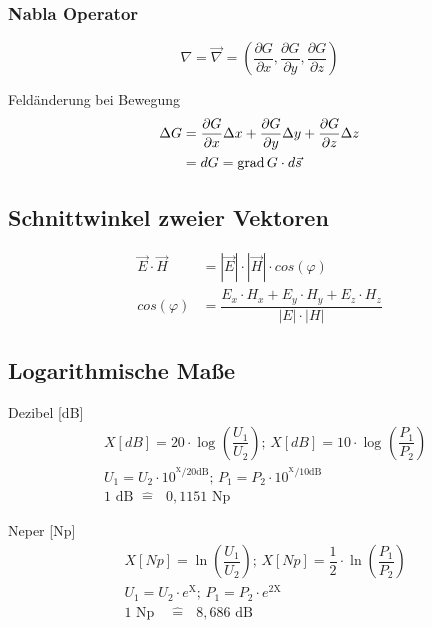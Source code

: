 \subsubsection*{Nabla Operator}
\[
    \nabla = \vec{\nabla} = \left( \dfrac{\partial G}{\partial x},
    \dfrac{\partial G}{\partial y}, \dfrac{\partial G}{\partial z} \right)
\]

Feldänderung bei Bewegung
\begin{align*}
    \Delta G & = \dfrac{\partial G}{\partial x} \Delta x + \dfrac{\partial G}{\partial y} \Delta y + \dfrac{\partial G}{\partial z} \Delta z \\
             & = dG = \operatorname{grad} G \cdot d \vec{s}
\end{align*}

\subsection{Schnittwinkel zweier Vektoren}
\begin{align*}
    \vec{E} \cdot \vec{H} & = |\vec{E}| \cdot |\vec{H}| \cdot cos(\varphi)                         \\
    cos(\varphi)          & = \dfrac{E_x \cdot H_x + E_y \cdot H_y + E_z \cdot H_z}{|E| \cdot |H|}
\end{align*}

\subsection{Logarithmische Maße}
\begin{description}
    \item Dezibel [dB]
          \begin{align*}
               & X[dB] = 20 \cdot \log_{} \left( \dfrac{U_1}{U_2}\right) \text{; }
              X[dB] = 10 \cdot \log_{} \left( \dfrac{P_1}{P_2}\right)              \\
               & U_1 = U_2 \cdot 10^{^\text{X}/\text{20dB}}\text{; }
              P_1 = P_2 \cdot  10^{^\text{X}/\text{10dB}}                          \\
               & 1 \text{ dB } \hat{=} \text{ } 0,1151 \text{ Np}
          \end{align*}

    \item Neper [Np]
          \begin{align*}
               & X[Np] = \ln \left(\dfrac{U_1}{U_2}\right) \text{; }
              X[Np] = \dfrac{1}{2} \cdot \ln \left(\dfrac{P_1}{P_2}\right) \\
               & U_1 = U_2 \cdot e^{\text{X}}\text{; }
              P_1 = P_2 \cdot  e^{\text{2X}}                               \\
               & 1 \text{ Np } \text{ } \hat{=} \text{ } 8,686 \text{ dB}  %
          \end{align*}
\end{description}

